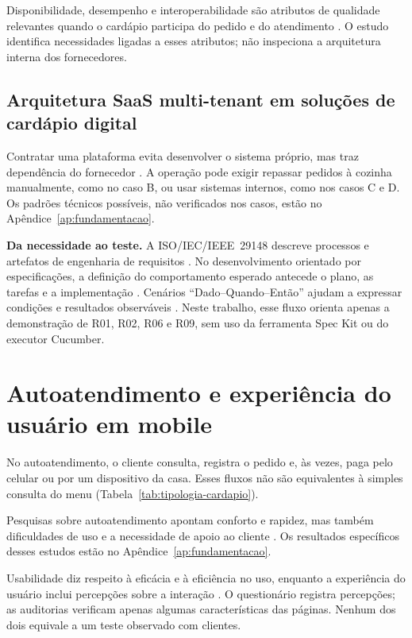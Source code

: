 Disponibilidade, desempenho e interoperabilidade são atributos de qualidade relevantes quando o cardápio participa do pedido e do atendimento \cite{bass2021software,iso25010}. O estudo identifica necessidades ligadas a esses atributos; não inspeciona a arquitetura interna dos fornecedores.

\subsection{Arquitetura SaaS multi-tenant em soluções de cardápio digital}
\label{sec:saas-multitenant}

Contratar uma plataforma evita desenvolver o sistema próprio, mas traz dependência do fornecedor \cite{richards2020fundamentals}. A operação pode exigir repassar pedidos à cozinha manualmente, como no caso B, ou usar sistemas internos, como nos casos C e D. Os padrões técnicos possíveis, não verificados nos casos, estão no Apêndice~\ref{ap:fundamentacao}.

\textbf{Da necessidade ao teste.} A ISO/IEC/IEEE~29148 descreve processos e artefatos de engenharia de requisitos \cite{iso29148}. No desenvolvimento orientado por especificações, a definição do comportamento esperado antecede o plano, as tarefas e a implementação \cite{github2026speckit}. Cenários ``Dado--Quando--Então'' ajudam a expressar condições e resultados observáveis \cite{cucumber2026gherkin}. Neste trabalho, esse fluxo orienta apenas a demonstração de R01, R02, R06 e R09, sem uso da ferramenta Spec Kit ou do executor Cucumber.

\section{Autoatendimento e experiência do usuário em mobile}
\label{sec:autoatendimento-ux}

No autoatendimento, o cliente consulta, registra o pedido e, às vezes, paga pelo celular ou por um dispositivo da casa. Esses fluxos não são equivalentes à simples consulta do menu (Tabela~\ref{tab:tipologia-cardapio}).

Pesquisas sobre autoatendimento apontam conforto e rapidez, mas também dificuldades de uso e a necessidade de apoio ao cliente \cite{oliveira2017autoatendimento,fioreti2026aplicativos}. Os resultados específicos desses estudos estão no Apêndice~\ref{ap:fundamentacao}.

Usabilidade diz respeito à eficácia e à eficiência no uso, enquanto a experiência do usuário inclui percepções sobre a interação \cite{maia2019usabilidade,iso9241-11}. O questionário registra percepções; as auditorias verificam apenas algumas características das páginas. Nenhum dos dois equivale a um teste observado com clientes.

